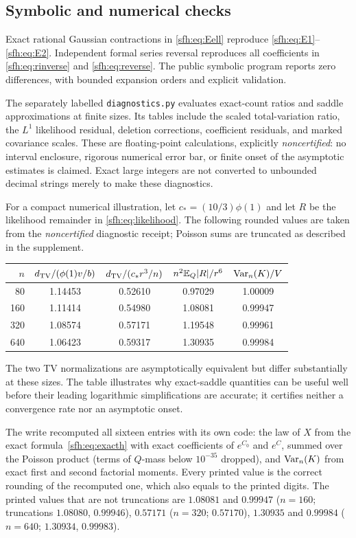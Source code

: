 \subsection{Symbolic and numerical checks}
Exact rational Gaussian contractions in \eqref{sfh:eq:Eell} reproduce \eqref{sfh:eq:E1}--\eqref{sfh:eq:E2}. Independent formal series reversal reproduces all coefficients in \eqref{sfh:eq:rinverse} and \eqref{sfh:eq:reverse}. The public symbolic program reports zero differences, with bounded expansion orders and explicit validation.

The separately labelled \texttt{diagnostics.py} evaluates exact-count ratios and saddle approximations at finite sizes. Its tables include the scaled total-variation ratio, the $L^1$ likelihood residual, deletion corrections, coefficient residuals, and marked covariance scales. These are floating-point calculations, explicitly \emph{noncertified}: no interval enclosure, rigorous numerical error bar, or finite onset of the asymptotic estimates is claimed. Exact large integers are not converted to unbounded decimal strings merely to make these diagnostics.


For a compact numerical illustration, let $c_*=(10/3)\phi(1)$ and let $R$ be the likelihood remainder in \eqref{sfh:eq:likelihood}. The following rounded values are taken from the \emph{noncertified} diagnostic receipt; Poisson sums are truncated as described in the supplement.
\begin{center}
\small
\begin{tabular}{rcccc}
\toprule
$n$ & $d_{\mathrm{TV}}/(\phi(1)v/b)$ & $d_{\mathrm{TV}}/(c_*r^3/n)$ & $n^2\mathbb E_Q|R|/r^6$ & $\operatorname{Var}_n(K)/V$\\
\midrule
80  & 1.14453 & 0.52610 & 0.97029 & 1.00009\\
160 & 1.11414 & 0.54980 & 1.08081 & 0.99947\\
320 & 1.08574 & 0.57171 & 1.19548 & 0.99961\\
640 & 1.06423 & 0.59317 & 1.30935 & 0.99984\\
\bottomrule
\end{tabular}
\end{center}
The two TV normalizations are asymptotically equivalent but differ substantially at these sizes. The table illustrates why exact-saddle quantities can be useful well before their leading logarithmic simplifications are accurate; it certifies neither a convergence rate nor an asymptotic onset.
\begin{writenote}
The write recomputed all sixteen entries with its own code: the law of $X$
from the exact formula~\eqref{sfh:eq:exacth} with exact coefficients of
$e^{C_0}$ and $e^C$, summed over the Poisson product (terms of $Q$-mass below
$10^{-35}$ dropped), and $\operatorname{Var}_n(K)$ from exact first and second factorial
moments.
Every printed value is the correct rounding of the recomputed one, which also
equals  to the printed digits. The
printed values that are not truncations are $1.08081$ and $0.99947$
($n=160$; truncations $1.08080$, $0.99946$), $0.57171$ ($n=320$; $0.57170$),
$1.30935$ and $0.99984$ ($n=640$; $1.30934$, $0.99983$).
\end{writenote}

